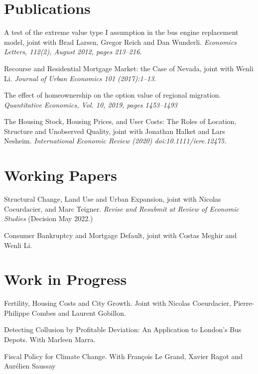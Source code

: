\documentclass[letterpaper]{article}
\renewenvironment{itemize}{
  \begin{list}{}{
    \setlength{\leftmargin}{1.5em}
  }
}{
  \end{list}
}
\begin{document}
\section*{Publications}

\begin{itemize}
\item A test of the extreme value type I assumption in the bus engine replacement model, joint with Brad Larsen, Gregor Reich and Dan Wunderli. {\it Economics Letters, 112(2), August 2012, pages 213--216}.
\item Recourse and Residential Mortgage Market: the Case of Nevada, joint with Wenli Li. {\it Journal of Urban Economics 101 (2017):1–13}.
\item The effect of homeownership on the option value of regional migration. {\it Quantitative Economics, Vol. 10, 2019, pages 1453--1493}
\item The Housing Stock, Housing Prices, and User Costs: The Roles of Location, Structure and Unobserved Quality, joint with Jonathan Halket and Lars Nesheim. {\it International Economic Review (2020) doi:10.1111/iere.12475.}
\end{itemize}


\section*{Working Papers}

\begin{itemize}

\item Structural Change, Land Use and Urban Expansion, joint with Nicolas Coeurdacier, and Marc Teigner. {\it Revise and Resubmit at Review of Economic Studies} (Decision May 2022.)
\item Consumer Bankruptcy and Mortgage Default, joint with Costas Meghir and Wenli Li. 
\end{itemize}

\section*{Work in Progress}

\begin{itemize}
\item Fertility, Housing Costs and City Growth. Joint with Nicolas Coeurdacier, Pierre-Philippe Combes and Laurent Gobillon.
\item Detecting Collusion by Profitable Deviation: An Application to London's Bus Depots. With Marleen Marra.
\item Fiscal Policy for Climate Change. With François Le Grand, Xavier Ragot and Aurélien Saussay
\end{itemize}
\end{document}
